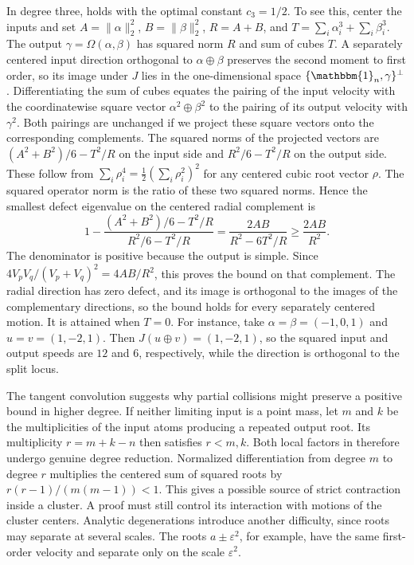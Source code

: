 \documentclass[12pt,reqno]{amsart}
\theoremstyle{definition}
\theoremstyle{remark}
\newcommand{\one}{\mathbbm{1}_n}
\newcommand{\eps}{\varepsilon}
\begin{document}
In degree three,  holds with the optimal constant \(c_3=1/2\). To see this, center the inputs and set \(A=\|\alpha\|_2^2\), \(B=\|\beta\|_2^2\), \(R=A+B\), and \(T=\sum_i\alpha_i^3+\sum_i\beta_i^3\).
The output \(\gamma=\Omega(\alpha,\beta)\) has squared norm \(R\) and sum of cubes \(T\).  A separately centered input direction orthogonal to \(\alpha\oplus\beta\) preserves the second moment to first order, so its image under \(J\) lies in the one-dimensional space \(\{\one,\gamma\}^{\perp}\).  Differentiating the sum of cubes equates the pairing of the input velocity with the coordinatewise square vector \(\alpha^2\oplus\beta^2\) to the pairing of its output velocity
with \(\gamma^2\). Both pairings are unchanged if we project these square vectors onto the corresponding complements. The squared norms of the projected vectors are \((A^2+B^2)/6-T^2/R\) on the input side and \(R^2/6-T^2/R\) on the output side. These follow from \(\sum_i\rho_i^4=\tfrac12(\sum_i\rho_i^2)^2\) for any centered cubic root vector \(\rho\).  The squared operator norm is the ratio of these two squared norms. Hence the smallest defect eigenvalue on the centered radial complement is
\begin{equation}\label{eq:cubic-transverse-defect}
 1-\frac{(A^2+B^2)/6-T^2/R}{R^2/6-T^2/R}
 =\frac{2AB}{R^2-6T^2/R}
 \geq\frac{2AB}{R^2}.
\end{equation}
The denominator is positive because the output is simple. Since \(4V_pV_q/(V_p+V_q)^2=4AB/R^2\), this proves the bound on that complement. The radial direction has zero defect, and its image is orthogonal to the images of the complementary directions, so the bound holds for every separately centered motion. It is attained when \(T=0\). For instance, take \(\alpha=\beta=(-1,0,1)\) and \(u=v=(1,-2,1)\).  Then \(J(u\oplus v)=(1,-2,1)\), so the squared input and output speeds are \(12\) and \(6\), respectively, while the direction is orthogonal to the split locus.

The tangent convolution suggests why partial collisions might preserve a positive bound in higher degree.  If neither limiting input is a point mass, let \(m\) and \(k\) be the multiplicities of the input atoms producing a repeated output root.  Its multiplicity \(r=m+k-n\) then satisfies \(r<m,k\).  Both local factors in  therefore undergo genuine degree reduction. Normalized differentiation from degree \(m\) to degree \(r\) multiplies the centered sum of squared roots by \(r(r-1)/(m(m-1))<1\). This gives a possible source of strict contraction inside a cluster.  A proof must still control its interaction with motions of the cluster centers. Analytic degenerations introduce another difficulty, since roots may separate at several scales. The roots \(a\pm\eps^2\), for example, have the same first-order velocity and separate only on the scale \(\eps^2\).
\end{document}

